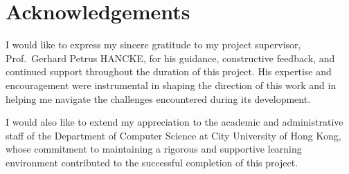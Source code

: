 \chapter*{Acknowledgements}

I would like to express my sincere gratitude to my project supervisor, Prof.\ Gerhard Petrus HANCKE, for his guidance, constructive feedback, and continued support throughout the duration of this project. His expertise and encouragement were instrumental in shaping the direction of this work and in helping me navigate the challenges encountered during its development.

I would also like to extend my appreciation to the academic and administrative staff of the Department of Computer Science at City University of Hong Kong, whose commitment to maintaining a rigorous and supportive learning environment contributed to the successful completion of this project.

\newpage
